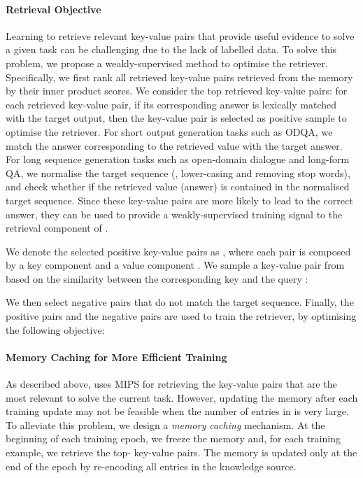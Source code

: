 \paragraph{Retrieval Objective}
Learning to retrieve relevant key-value pairs that provide useful evidence to solve a given task can be challenging due to the lack of labelled data.
To solve this problem, we propose a weakly-supervised method to optimise the retriever.
Specifically, we first rank all retrieved key-value pairs retrieved from the memory  by their inner product scores. We consider the top retrieved key-value pairs: for each retrieved key-value pair, if its corresponding answer is lexically matched with the target output, then the key-value pair is selected as positive sample to optimise the retriever.
For short output generation tasks such as ODQA, we match the answer corresponding to the retrieved value with the target answer.
For long sequence generation tasks such as open-domain dialogue and long-form QA, we normalise the target sequence (\ie, lower-casing and removing stop words), and check whether if the retrieved value (answer) is contained in the normalised target sequence.
Since these key-value pairs are more likely to lead to the correct answer, they can be used to provide a weakly-supervised training signal to the retrieval component of \ModelName.


We denote the selected positive key-value pairs as , where each pair  is composed by a key component  and a value component .
We sample a key-value pair  from  based on the similarity between the corresponding key  and the query :

We then select  negative pairs  that do not match the target sequence.
Finally, the positive pairs  and the negative pairs  are used to train the retriever, by optimising the following objective:



\paragraph{Memory Caching for More Efficient Training}
As described above, \ModelName uses MIPS for retrieving the key-value pairs that are the most relevant to solve the current task.
However, updating the memory  after each training update may not be feasible when the number of entries in  is very large.
To alleviate this problem, we design a \emph{memory caching} mechanism. At the beginning of each training epoch, we freeze the memory  and, for each training example, we retrieve the top- key-value pairs.
The memory  is updated only at the end of the epoch by re-encoding all entries in the knowledge source.




